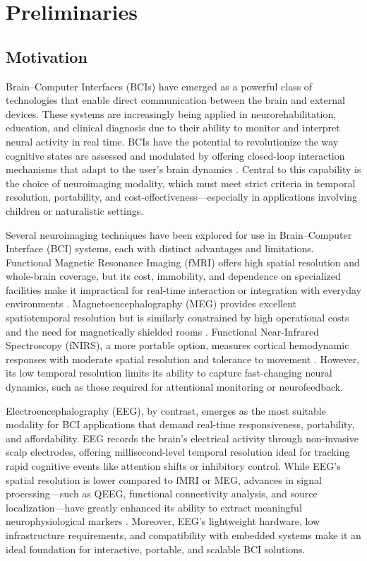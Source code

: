 \chapter{Preliminaries}\label{sec:preliminaries}

\section{Motivation}\label{sec:motivation}

Brain–Computer Interfaces (BCIs) have emerged as a powerful class of technologies that enable direct communication between the brain and external devices. These systems are increasingly being applied in neurorehabilitation, education, and clinical diagnosis due to their ability to monitor and interpret neural activity in real time. BCIs have the potential to revolutionize the way cognitive states are assessed and modulated by offering closed-loop interaction mechanisms that adapt to the user’s brain dynamics \cite{Lim2023,Lin2025}. Central to this capability is the choice of neuroimaging modality, which must meet strict criteria in temporal resolution, portability, and cost-effectiveness—especially in applications involving children or naturalistic settings.

Several neuroimaging techniques have been explored for use in Brain–Computer Interface (BCI) systems, each with distinct advantages and limitations. Functional Magnetic Resonance Imaging (fMRI) offers high spatial resolution and whole-brain coverage, but its cost, immobility, and dependence on specialized facilities make it impractical for real-time interaction or integration with everyday environments \cite{Yang2025}. Magnetoencephalography (MEG) provides excellent spatiotemporal resolution but is similarly constrained by high operational costs and the need for magnetically shielded rooms \cite{Peksa2023}. Functional Near-Infrared Spectroscopy (fNIRS), a more portable option, measures cortical hemodynamic responses with moderate spatial resolution and tolerance to movement \cite{Doherty2023}. However, its low temporal resolution limits its ability to capture fast-changing neural dynamics, such as those required for attentional monitoring or neurofeedback.

Electroencephalography (EEG), by contrast, emerges as the most suitable modality for BCI applications that demand real-time responsiveness, portability, and affordability. EEG records the brain's electrical activity through non-invasive scalp electrodes, offering millisecond-level temporal resolution ideal for tracking rapid cognitive events like attention shifts or inhibitory control. While EEG's spatial resolution is lower compared to fMRI or MEG, advances in signal processing—such as QEEG, functional connectivity analysis, and source localization—have greatly enhanced its ability to extract meaningful neurophysiological markers \cite{Caiado2025,Yadav2023, Varbu2022}. Moreover, EEG's lightweight hardware, low infrastructure requirements, and compatibility with embedded systems make it an ideal foundation for interactive, portable, and scalable BCI solutions.

